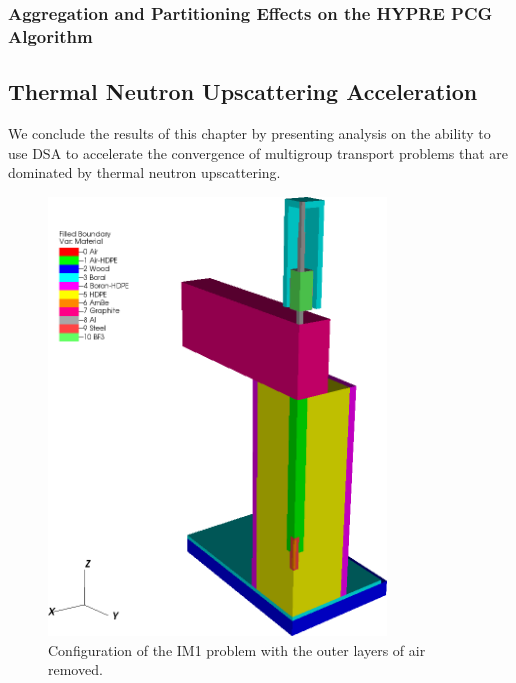 \subsubsection{Aggregation and Partitioning Effects on the HYPRE PCG Algorithm}
\label{sec::DSA_Results_Scaling_Parametric}

\subsection{Thermal Neutron Upscattering Acceleration}
\label{sec::DSA_Results_IM1}

We conclude the results of this chapter by presenting analysis on the ability to use DSA to accelerate the convergence of multigroup transport problems that are dominated by thermal neutron upscattering.

\begin{figure}
\centering
\includegraphics[width=0.8\textwidth]{figures/sec_DSA/IM1_configuration_Rev1.png}
\caption{Configuration of the IM1 problem with the outer layers of air removed.}
\label{fig::IM1_config}
\end{figure}


